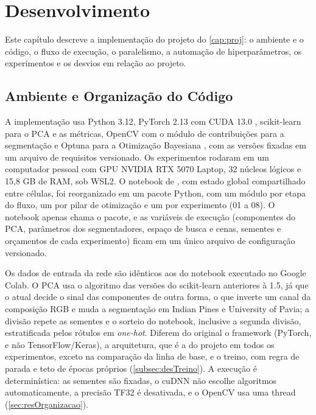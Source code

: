 \chapter{Desenvolvimento}
\label{cap:desenvolvimento}

Este capítulo descreve a implementação do projeto do \autoref{cap:proj}: o ambiente e o código, o fluxo de execução, o paralelismo, a automação de hiperparâmetros, os experimentos e os desvios em relação ao projeto.

\section{Ambiente e Organização do Código}
\label{sec:ambiente}

A implementação usa Python 3.12, PyTorch 2.13 com CUDA 13.0 \cite{Paszke2019PyTorch}, scikit-learn para o PCA e as métricas, OpenCV com o módulo de contribuições para a segmentação e Optuna para a Otimização Bayesiana \cite{Akiba2019Optuna}, com as versões fixadas em um arquivo de requisitos versionado. Os experimentos rodaram em um computador pessoal com GPU NVIDIA RTX 5070 Laptop, 32 núcleos lógicos e 15,8 GB de RAM, sob WSL2. O notebook de , com estado global compartilhado entre células, foi reorganizado em um pacote Python, com um módulo por etapa do fluxo, um por pilar de otimização e um por experimento (01 a 08). O notebook apenas chama o pacote, e as variáveis de execução (componentes do PCA, parâmetros dos segmentadores, espaço de busca e cenas, sementes e orçamentos de cada experimento) ficam em um único arquivo de configuração versionado.

Os dados de entrada da rede são idênticos aos do notebook executado no Google Colab. O PCA usa o algoritmo das versões do scikit-learn anteriores à 1.5, já que o atual decide o sinal das componentes de outra forma, o que inverte um canal da composição RGB e muda a segmentação em Indian Pines e University of Pavia; a divisão repete as sementes e o sorteio do notebook, inclusive a segunda divisão, estratificada pelos rótulos em \textit{one-hot}. Diferem do original o framework (PyTorch, e não TensorFlow/Keras), a arquitetura, que é a do projeto em todos os experimentos, exceto na comparação da linha de base, e o treino, com regra de parada e teto de épocas próprios (\autoref{subsec:desTreino}). A execução é determinística: as sementes são fixadas, o cuDNN não escolhe algoritmos automaticamente, a precisão TF32 é desativada, e o OpenCV usa uma thread (\autoref{sec:resOrganizacao}).

